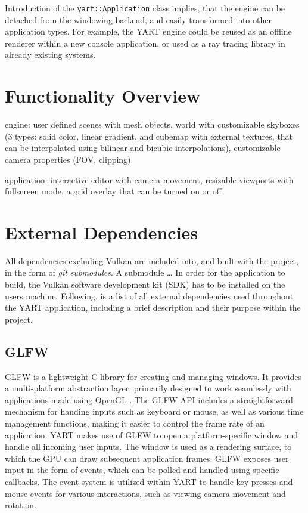 Introduction of the \verb|yart::Application| class implies, that the engine can be detached from the windowing backend, and easily transformed into other application types.
For example, the YART engine could be reused as an offline renderer within a new console application, or used as a ray tracing library in already existing systems.

\section{Functionality Overview}

engine:
user defined scenes with mesh objects, world with customizable skyboxes (3 types: solid color, linear gradient, and cubemap with external textures, that can be interpolated using bilinear and bicubic interpolations), customizable camera properties (FOV, clipping)

application:
interactive editor with camera movement, resizable viewports with fullscreen mode, a grid overlay that can be turned on or off

\section{External Dependencies}

All dependencies excluding Vulkan are included into, and built with the project, in the form of \textit{git submodules}. 
A submodule \dots
In order for the application to build, the Vulkan software development kit (SDK) has to be installed on the users machine. 
Following, is a list of all external dependencies used throughout the YART application, including a brief description and their purpose within the project.

\subsection{GLFW}

GLFW \supercite{GLFW} is a lightweight C library for creating and managing windows.
It provides a multi-platform abstraction layer, primarily designed to work seamlessly with applications made using OpenGL \supercite{Neider1993}.
The GLFW API includes a straightforward mechanism for handing inputs such as keyboard or mouse, as well as various time management functions, making it easier to control the frame rate of an application.
YART makes use of GLFW to open a platform-specific window and handle all incoming user inputs. 
The window is used as a rendering surface, to which the GPU can draw subsequent application frames. 
GLFW exposes user input in the form of events, which can be polled and handled using specific callbacks. 
The event system is utilized within YART to handle key presses and mouse events for various interactions, such as viewing-camera movement and rotation.

